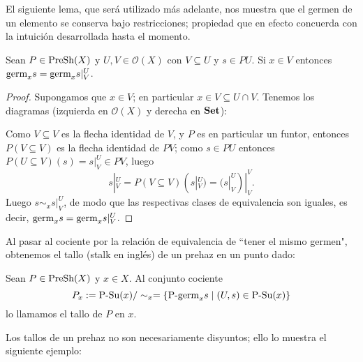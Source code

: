 El siguiente lema, que será utilizado más adelante, nos muestra que el germen de un elemento se conserva bajo restricciones; propiedad que en efecto concuerda con la intuición desarrollada hasta el momento.
\begin{Lema}
   Sean $P\in\normalfont{\text{PreSh}}(X)$ y $U,V\in\mathcal{O}(X)$ con $V\subseteq U$ y $s\in PU$. Si $x\in V$ entonces $\normalfont{\text{germ}}_{x}s=\normalfont{\text{germ}}_{x}s|^{U}_{V}$.
\end{Lema}
\begin{proof}
   Supongamos que $x\in V$; en particular $x\in V\subseteq U\cap V$. Tenemos los diagramas (izquierda en $\mathcal{O}(X)$ y derecha en $\normalfont{\textbf{Set}}$):
   
   Como $V\subseteq V$ es la flecha identidad de $V$, y $P$ es en particular un funtor, entonces $P(V\subseteq V)$ es la flecha identidad de $PV$; como $s\in PU$ entonces $P(U\subseteq V)(s)=s|^{U}_{V}\in PV$, luego 
   $$
   s|^{U}_{V}=P(V\subseteq V)(s|^{U}_{V})=(s|^{U}_{V})|^{V}_{V}.
   $$
   Luego $s\sim_{x}s|^{U}_{V}$, de modo que las respectivas clases de equivalencia son iguales, es decir, $\normalfont{\text{germ}}_{x}s=\normalfont{\text{germ}}_{x}s|^{U}_{V}$.
\end{proof}
Al pasar al cociente por la relación de equivalencia de ``tener el mismo germen", obtenemos el tallo (stalk en inglés) de un prehaz en un punto dado:
\begin{Def}
   Sean $P\in\normalfont{\text{PreSh}}(X)$ y $x\in X$. Al conjunto cociente
   $$
   P_{x}:=\normalfont{\text{P-Su}}(x)/\sim_{x}=\left\lbrace \normalfont{\text{P-germ}}_{x}s\mid (U,s)\in\normalfont{\text{P-Su}}(x)\right\rbrace
   $$
   lo llamamos el tallo de $P$ en $x$.
\end{Def}
Los tallos de un prehaz no son necesariamente disyuntos; ello lo muestra el siguiente ejemplo:

